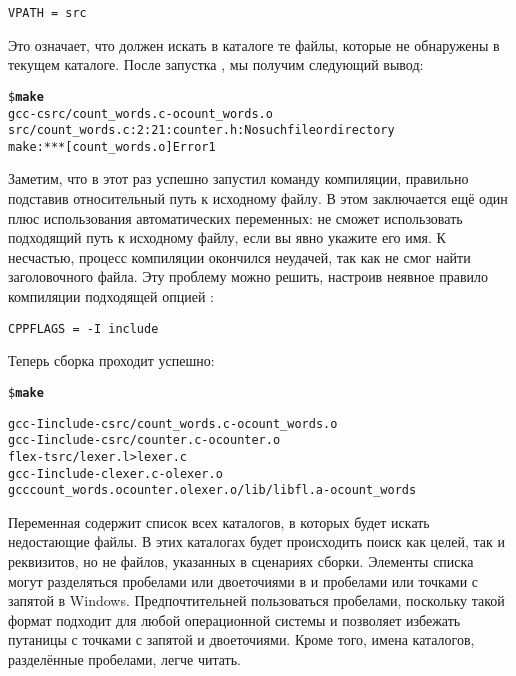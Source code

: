 {\footnotesize
\begin{verbatim}
VPATH = src
\end{verbatim}
}

Это означает, что \GNUmake{} должен искать в каталоге 
те файлы, которые не обнаружены в текущем каталоге. После запустка
\GNUmake{}, мы получим следующий вывод:

{\footnotesize
\begin{alltt}
\$ \textbf{make}
gcc -c src/count\_words.c -o count\_words.o
src/count\_words.c:2:21: counter.h: No such file or directory
make: *** [count\_words.o] Error 1
\end{alltt}
}

Заметим, что в этот раз \GNUmake{} успешно запустил команду
компиляции, правильно подставив относительный путь к исходному файлу.
В этом заключается ещё один плюс использования автоматических
переменных: \GNUmake{} не сможет использовать подходящий путь к
исходному файлу, если вы явно укажите его имя. К несчастью, процесс
компиляции окончился неудачей, так как  не смог найти
заголовочного файла. Эту проблему можно решить, настроив неявное
правило компиляции подходящей опцией :

{\footnotesize
\begin{verbatim}
CPPFLAGS = -I include
\end{verbatim}
}

Теперь сборка проходит успешно:

{\footnotesize
\begin{alltt}
\$ \textbf{make}

gcc -I include -c src/count\_words.c -o count\_words.o
gcc -I include -c src/counter.c -o counter.o
flex -t src/lexer.l > lexer.c
gcc -I include -c lexer.c -o lexer.o
gcc count\_words.o counter.o lexer.o /lib/libfl.a -o count\_words
\end{alltt}
}

Переменная  содержит список всех каталогов, в которых
\GNUmake{} будет искать недостающие файлы. В этих каталогах будет
происходить поиск как целей, так и реквизитов, но не файлов, указанных
в сценариях сборки. Элементы списка могут разделяться пробелами или
двоеточиями в \UNIX{} и пробелами или точками с запятой в Windows.
Предпочтительней пользоваться пробелами, поскольку такой формат
подходит для любой операционной системы и позволяет избежать путаницы
с точками с запятой и двоеточиями. Кроме того, имена каталогов,
разделённые пробелами, легче читать.

